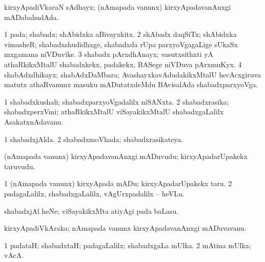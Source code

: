 {{\bentry
{} 
\gl{\gu}
\expl{}
\bmng
 kirxyApadiVkaraN sAdhayx; (nAmapada \mo vanunx) kirxyApadavanAnxgi mADabahudAda. 
\emng
\eentry

\bentry
{} 
\gl{\nA}
\expl{}
\bmng
\emng
\eentry

\bentry
{} 
\gl{\kirx}
\expl{}
\bmng
\emng
\eentry

\bentry
{} 
\gl{\nA}
\expl{}
\bmng
\bnum
\num{1} pada; shabadx; shAbidxka aBivayxkitx. 
\num{2} shAbadx daqSiTx; shAbidxka vimasheR; shabadxshudidhxge, shabadxda rUpa parxyoVgagaLige sUkaSx mxgamana niVDuvike. 
\num{3} shabadx pArxdhAnayx; vasutxsithxti yA athaRkikxMtalU shabadxkekx, padakekx, BASege niVDuva pArxmuKyx. 
\num{4} shabAdxdhikayx; shabAdxDaMbara; AvashayxkavAdudakikxMtalU hecAcxgiruva matutx athaRvanunx masuku mADutatxdeMdu BAvisalAda shabadxparxyoVga. 
\enum
\emng
\eentry

\bentry
{} 
\gl{\nA}
\expl{}
\bmng
\bnum
\num{1} shabadxkushali; shabadxparxyoVgadalilx niSANxta. 
\num{2} shabadxrasika; shabadxperxVmi; athaRkikxMtalU viSayakikxMtalU shabadxgaLalilx AsakatxnAdavanu. 
\enum
\emng
\eentry

\bentry
{} 
\gl{\gu}
\expl{}
\bmng
\bnum
\num{1} shabadxjAlda. 
\num{2} shabadxmoVhada; shabadxrasikateya. 
\enum
\emng
\eentry

\bentry
{} 
\gl{\nA}
\expl{}
\bmng
 (nAmapada \mo vanunx) kirxyApadavanAnxgi mADuvudu; kirxyApadarUpakekx taruvudu. 
\emng
\eentry

\bentry
{} 
\gl{\sakirx}
\expl{}
\bmng
\bnum
\num{1} (nAmapada \mo vanunx) kirxyApada mADu; kirxyApadarUpakekx taru. 
\num{2} padagaLalilx, shabadxgaLalilx, vAgUrxpadalilx -- heVLu. 
\enum
\emng

\noindent 
\gl{\akirx}
\expl{}
\bmng
 shabadxjAl heNe; viSayakikxMta atiyAgi pada baLasu. 
\emng
\eentry

\bentry 
{} 
\gl{\nA}
\expl{}
\bmng
 kirxyApadiVkAraka; nAmapada \mo vanunx kirxyApadavanAnxgi mADuvavanu. 
\emng
\eentry

\bentry
{} 
\gl{\kirxvi}
\expl{}
\bmng
\bnum
\num{1} padataH; shabadxtaH; padagaLalilx; shabadxgaLa mUlka. 
\num{2} mAtina mUlka; vAcA. 
\enum
\emng
\eentry

}}
